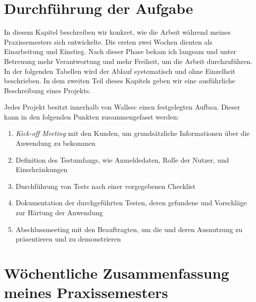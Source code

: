 \section{Durchführung der Aufgabe}

In diesem Kapitel beschreiben wir konkret, wie die Arbeit während meines Praxissemesters sich entwickelte. Die ersten zwei Wochen dienten als Einarbeitung und Einstieg. Nach dieser Phase bekam ich langsam und unter Betreuung mehr Verantwortung und mehr Freiheit, um die Arbeit durchzuführen. In der folgenden Tabellen wird der Ablauf systematisch und ohne Einzelheit beschrieben. In dem zweiten Teil dieses Kapitels geben wir eine ausführliche Beschreibung eines Projekts.

Jedes Projekt besitzt innerhalb von Wallsec einen festgelegten Aufbau. Dieser kann in den folgenden Punkten zusammengefasst werden:

\begin{enumerate} \label{Projektablauf}
    \item \textit{Kick-off Meeting} mit den Kunden, um grundsätzliche Informationen über die Anwendung zu bekommen
    \item Definition des Testumfangs, wie Anmeldedaten, Rolle der Nutzer,  und Einschränkungen
    \item Durchführung von Tests nach einer vorgegebenen Checklist
    \item Dokumentation der durchgeführten Testen, deren gefundene  und Vorschläge zur Härtung der Anwendung
    \item Abschlussmeeting mit den Beauftragten, um die  und deren Ausnutzung zu präsentieren und zu demonstrieren
\end{enumerate} 

\section{Wöchentliche Zusammenfassung meines Praxissemesters}

